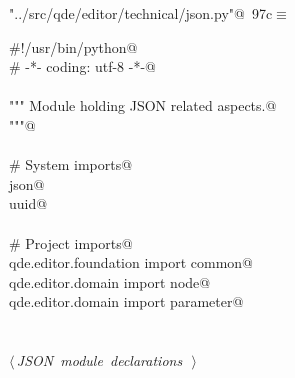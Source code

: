 \documentclass[
    a4paper,      %
    10pt,         %
    openright,    %
    notitlepage,  %
    parskip=half, %
]{scrreprt}       %
\theoremstyle{definition}                    %
\begin{document}
\begin{flushleft} \small
\begin{minipage}{\linewidth}\label{scrap161}\raggedright\small
{} \verb@"../src/qde/editor/technical/json.py"@\nobreak\ {\footnotesize {97c}}$\equiv$
\vspace{-1ex}
\begin{list}{}{} \item
\mbox{}\lstinline@#!/usr/bin/python@\\
\mbox{}\lstinline@# -*- coding: utf-8 -*-@\\
\mbox{}\lstinline@@\\
\mbox{}\lstinline@""" Module holding JSON related aspects.@\\
\mbox{}\lstinline@"""@\\
\mbox{}\lstinline@@\\
\mbox{}\lstinline@# System imports@\\
\mbox{}\lstinline@import json@\\
\mbox{}\lstinline@import uuid@\\
\mbox{}\lstinline@@\\
\mbox{}\lstinline@# Project imports@\\
\mbox{}\lstinline@from qde.editor.foundation import common@\\
\mbox{}\lstinline@from qde.editor.domain import node@\\
\mbox{}\lstinline@from qde.editor.domain import parameter@\\
\mbox{}\lstinline@@\\
\mbox{}\lstinline@@\\
\mbox{}\lstinline@@\hbox{$\langle\,${\itshape JSON module declarations}\nobreak\ {\footnotesize {}}$\,\rangle$}\lstinline@@\\
\mbox{}\lstinline@@{\NWsep}
\end{list}
\vspace{-1.5ex}
\footnotesize
\begin{list}{}{\setlength{\itemsep}{-\parsep}\setlength{\itemindent}{-\leftmargin}}

\item{}
\end{list}
\end{minipage}\vspace{4ex}
\end{flushleft}
\end{document}
